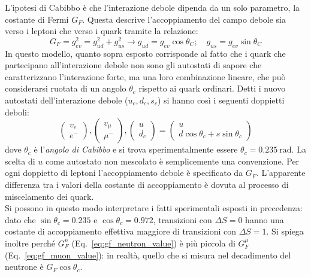 \documentclass{subnucbo}
\begin{document}
L'ipotesi di Cabibbo è che l'interazione debole dipenda da un solo parametro, la costante di Fermi $G_{F}$. Questa descrive l'accoppiamento del campo debole sia verso i leptoni che verso i quark tramite la relazione:
\begin{equation}
        G _ { F } = g _ { e v } ^ { 2 } = g _ { u d } ^ { 2 } + g _ { u s } ^ { 2 } \longrightarrow g _ { u d } = g _ { e v } \cos \theta _ { C } ; \quad g _ { u s } = g _ { e v } \sin \theta _ { C }
\end{equation}
In questo modello, quanto sopra esposto corrisponde al fatto che i quark che partecipano all'interazione debole non sono gli autostati di sapore che caratterizzano l'interazione forte, ma una loro combinazione lineare, che può considerarsi ruotata di un angolo $\theta_{c}$ rispetto ai quark ordinari. Detti i nuovo autostati dell'interazione debole ($u_{c}, d_{c}, s_{c}$) si hanno così i seguenti doppietti deboli:
\begin{equation}
        \left( \begin{array} { c } { v _ { e } } \\ { e ^ { - } } \end{array} \right) , \left( \begin{array} { c } { v _ { \mu } } \\ { \mu ^ { - } } \end{array} \right) , \left( \begin{array} { c } { u } \\ { d _ { c } } \end{array} \right) = \left( \begin{array} { c } { u } \\ { d \cos \theta _ { c } + s \sin \theta _ { c } } \end{array} \right)
        \label{eq:weak_doublets}
\end{equation}
dove $\theta_{c}$ è l'\textit{angolo di Cabibbo} e si trova sperimentalmente essere $\theta _ { c } = 0.235\: \mathrm { rad }$. La scelta di $u$ come autostato non mescolato è semplicemente una convenzione. Per ogni doppietto di leptoni l'accoppiamento debole è specificato da $G_{F}$. L'apparente differenza tra i valori della costante di accoppiamento è dovuta al processo di miscelamento dei quark. \\
Si possono in questo modo interpretare i fatti sperimentali esposti in precedenza: dato che $\sin\theta_{c}=0.235$ e $\cos\theta_{c}=0.972$, transizioni con $\Delta S = 0$ hanno una costante di accoppiamento effettiva maggiore di transizioni con $\Delta S = 1$. Si spiega inoltre perché $G_{F}^{n}$ (Eq.~\ref{eq:gf_neutron_value}) è più piccola di $G_{F}^{\mu}$ (Eq.~\ref{eq:gf_muon_value}): in realtà, quello che si misura nel decadimento del neutrone è $G_{F}\cos \theta_{c}$.
\end{document}

